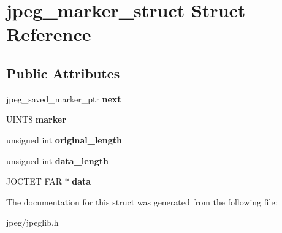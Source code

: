 \hypertarget{structjpeg__marker__struct}{}\section{jpeg\+\_\+marker\+\_\+struct Struct Reference}
\label{structjpeg__marker__struct}
\subsection*{Public Attributes}
\begin{DoxyCompactItemize}
\item 
jpeg\+\_\+saved\+\_\+marker\+\_\+ptr {\bfseries next}\hypertarget{structjpeg__marker__struct_a1cb619806ea91b42a46b2a04fafabd82}{}\label{structjpeg__marker__struct_a1cb619806ea91b42a46b2a04fafabd82}

\item 
U\+I\+N\+T8 {\bfseries marker}\hypertarget{structjpeg__marker__struct_a154cf70fc9b4f86da631ca08a12a8d33}{}\label{structjpeg__marker__struct_a154cf70fc9b4f86da631ca08a12a8d33}

\item 
unsigned int {\bfseries original\+\_\+length}\hypertarget{structjpeg__marker__struct_a3b17d58a17fa6be8560b697da814dfd3}{}\label{structjpeg__marker__struct_a3b17d58a17fa6be8560b697da814dfd3}

\item 
unsigned int {\bfseries data\+\_\+length}\hypertarget{structjpeg__marker__struct_a98412e9bccde6954ce55f611ad146a6b}{}\label{structjpeg__marker__struct_a98412e9bccde6954ce55f611ad146a6b}

\item 
J\+O\+C\+T\+ET F\+AR $\ast$ {\bfseries data}\hypertarget{structjpeg__marker__struct_ac8d0d5b3294a6ac3629640d4164a1ea6}{}\label{structjpeg__marker__struct_ac8d0d5b3294a6ac3629640d4164a1ea6}

\end{DoxyCompactItemize}


The documentation for this struct was generated from the following file\+:\begin{DoxyCompactItemize}
\item 
jpeg/jpeglib.\+h\end{DoxyCompactItemize}
